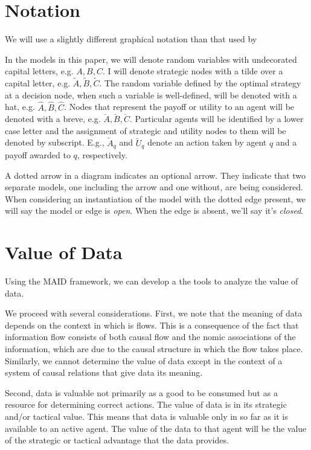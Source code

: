 \documentclass[../thesis.tex]{subfiles}
\begin{document}

\section{Notation}
\label{sec:maid-notation}

We will use a slightly different graphical notation than that used by
\cite{koller2003multi}

In the models in this paper, we will denote random variables
with undecorated capital letters, e.g. $A, B, C$.
I will denote strategic nodes with a tilde over a capital
letter, e.g. $\tilde{A}, \tilde{B}, \tilde{C}$.
The random variable defined by the optimal strategy at a
decision node, when such a variable is well-defined,
will be denoted with a hat, e.g. $\hat{A}, \hat{B}, \hat{C}$.
Nodes that represent the payoff or utility to an
agent will be denoted with a breve, e.g.
$\breve{A}, \breve{B}, \breve{C}$.
Particular agents will be identified by a lower case
letter and the assignment of strategic and utility nodes
to them will be denoted by subscript.
E.g., $\tilde{A}_q$ and $\breve{U}_q$ denote an action
taken by agent $q$ and a payoff awarded to $q$,
respectively.

A dotted arrow in a diagram indicates an optional arrow.
They indicate that two separate models, one including the
arrow and one without, are being considered.
When considering an instantiation of the model with the dotted
edge present, we will say the model or edge is \emph{open}.
When the edge is absent, we'll say it's \emph{closed}.

\section{Value of Data}
\label{sec:value-of-data}

Using the MAID framework, we can develop a
the tools to analyze the value of data.

We proceed with several considerations.
First, we note that the meaning of data depends
on the context in which is flows.
This is a consequence of the fact that information
flow consists of both causal flow and the nomic
associations of the information, which are due
to the causal structure in which the flow takes
place.
Similarly, we cannot determine the value of data
except in the context of a system of causal relations
that give data its meaning.

Second, data is valuable not primarily as a good to
be consumed but as a resource for determining
correct actions.
The value of data is in its strategic and/or tactical
value.
This means that data is valuable only in so far as it
is available to an active agent.
The value of the data to that agent will be the value
of the strategic or tactical advantage that the data
provides.
\end{document}
